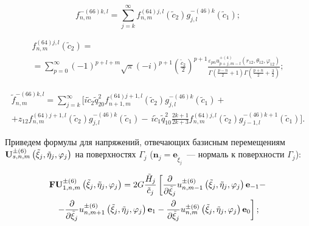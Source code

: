 \begin{russian}
\begin{equation}
f_{n,m}^{ - (66)k,l} = \sum\limits_{j = k}^\infty  {f_{n,m}^{(64)j,l}({{\tilde c}_2})g_{j,l}^{ - (46)k}} ({\tilde c_1});
\end{equation}

\begin{multline}
f_{n,m}^{(64)j,l}({\tilde c_2}) = \\
= \sum\limits_{p = 0}^\infty  {{{( - 1)}^{p + l + m}}} \sqrt \pi  {( - i)^{p + 1}}{\left( {\frac{{{{\tilde c}_2}}}{2}} \right)^{p + 1}}\frac{{{\varepsilon _{pn}}u_{p + j,m - l}^{ + (4)}\left( {{r_{12}},{\theta _{12}},{\varphi _{12}}} \right)}}{{\Gamma \left( {\frac{{p - n}}{2} + 1} \right)\Gamma \left( {\frac{{p + n}}{2} + \frac{3}{2}} \right)}};
\end{multline}

\begin{multline}
\tilde f_{n,m}^{ - (66)k,l} = \sum\limits_{j = k}^\infty\bigg[i{{\tilde c}_2}\tilde q_{20}^2f_{n + 1,m}^{(64)j + 1,l}({{\tilde c}_2})g_{j,l}^{ - (46)k}({{\tilde c}_1}) + \\
+ {z_{12}}f_{n,m}^{(64)j + 1,l}({{\tilde c}_2})g_{j,l}^{ - (46)k}({{\tilde c}_1}) - \frac{{}}{{}}i{{\tilde c}_1}\tilde q_{10}^2\frac{{2k + 1}}{{2k + 3}}f_{n,m}^{(64)j,l}({{\tilde c}_2})g_{j - 1,l}^{ - (46)k + 1}({{\tilde c}_1}) \bigg].
\end{multline}

Приведем формулы для напряжений, отвечающих базисным перемещениям ${\bf{U}}_{s,n,m}^{ \pm (6)}\left( {{{\tilde \xi }_j},{{\tilde \eta }_j},{\varphi _j}} \right)$ на поверхностях $\Gamma_j$ ($\mathbf{n}_j=\mathbf{e}_{\tilde\xi_j}$~--- нормаль к поверхности $\Gamma_j$):

\begin{multline}
{\bf{FU}}_{1,n,m}^{ \pm (6)}\left( {{{\tilde \xi }_j},{{\tilde \eta }_j},{\varphi _j}} \right) = 2G\frac{{{{\tilde H}_j}}}{{{{\tilde c}_j}}}\left[ {\frac{\partial }{{\partial {{\tilde \xi }_j}}}u_{n,m - 1}^{ \pm (6)}\left( {{{\tilde \xi }_j},{{\tilde \eta }_j},{\varphi _j}} \right){{\bf{e}}_{ - 1}} - } \right.\\
\left. { - \frac{\partial }{{\partial {{\tilde \xi }_j}}}u_{n,m + 1}^{ \pm (6)}\left( {{{\tilde \xi }_j},{{\tilde \eta }_j},{\varphi _j}} \right){{\bf{e}}_1} - \frac{\partial }{{\partial {{\tilde \xi }_j}}}u_{n,m}^{ \pm (6)}\left( {{{\tilde \xi }_j},{{\tilde \eta }_j},{\varphi _j}} \right){{\bf{e}}_0}} \right];
\label{eq:10:25o}
\end{multline}


\end{russian}
